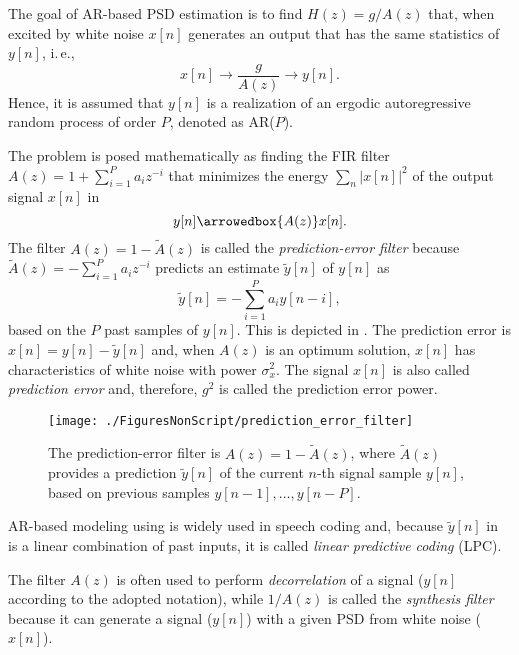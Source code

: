 The goal of AR-based PSD estimation is to find $H(z)=g/A(z)$ that, when excited by white noise $x[n]$ generates an output that has the same statistics of $y[n]$, i.\,e.,
\[
x[n] \rightarrow\boxed{\frac{g}{A(z)}}\rightarrow y[n].
\]
Hence, it is assumed that $y[n]$ is a realization of an ergodic autoregressive random process of order $P$, denoted as AR($P$).


The problem is posed mathematically as finding the FIR filter $A(z)=1+\sum_{i=1}^P a_i z^{-i}$ that minimizes the energy $\sum_n |x[n]|^2$ of the output signal $x[n]$ in
\[
y[n] \arrowedbox{A(z)} x[n].
\]
The filter $A(z)=1-\tilde A(z)$ is called the \emph{prediction-error filter} because $\tilde A(z)=-\sum_{i=1}^P a_i z^{-i}$ predicts an estimate $\tilde y[n]$ of $y[n]$ as
\begin{equation}
\tilde y[n] = -\sum_{i=1}^P a_i y[n-i],
\label{eq:lpcPrediction}
\end{equation}
based on the $P$ past samples of $y[n]$. This is depicted in . The prediction error is $x[n] = y[n] - \tilde y[n]$ and, when $A(z)$ is an optimum solution, $x[n]$ has characteristics of white noise with power $\sigma_x^2$. The signal $x[n]$ is also called \emph{prediction error} and, therefore, $g^2$ is called the prediction error power. 

\begin{figure}[htbp]
\centering
\texttt{[image: ./FiguresNonScript/prediction\_error\_filter]}
\caption{The prediction-error filter is $A(z)=1-\tilde A(z)$, where $\tilde A(z)$ provides a prediction $\tilde y[n]$ of the current $n$-th signal sample $y[n]$, based on previous samples $y[n-1], \ldots, y[n-P]$.\label{fig:prediction_error_filter}}
\end{figure}


AR-based modeling using  is widely used in speech coding and, because $\tilde y[n]$ in  is a linear combination of past inputs, 
it is called \emph{linear predictive coding} (LPC).

The filter $A(z)$ is often used to perform \emph{decorrelation} of a signal ($y[n]$ according to the adopted notation), while $1/A(z)$ is called the \emph{synthesis filter} because it can generate a signal ($y[n]$) with a given PSD from white noise ($x[n]$).

